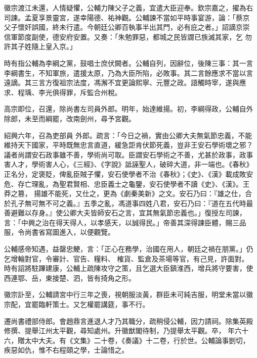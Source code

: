 \begin{pinyinscope}
 徽宗渡江未還，人情疑懼，公輔力陳父子之義，宜遣大臣迎奉。欽宗嘉之，擢為右司諫。孟夏享景靈宮，遂幸陽德、祐神觀。公輔諫不當如平時事宴游，論：「蔡京父子懷奸誤國，終未行遣。今朝廷公卿百執事半出其門，必有庇之者。」詔謫京崇信軍節度副使，德安府安置。又奏：「朱勉罪惡，都城之民皆謂已族滅其家，乞
 勿許其子姓隨上皇入京。」



 時有指公輔為李綱之黨，鼓唱士庶伏闕者。公輔自列，因辭位，後陳三事：其一言李綱書生，不知軍旅，遣援太原，乃為大臣所陷，必敗事。其二言餘應求不當以言遠謫。其三言方復祖宗法度，馮澥不宜更論熙寧、元豐之政。語觸時宰，遂與應求、程瑀、李光俱得罪，斥監合州稅。



 高宗即位，召還，除尚書左司員外郎。明年，始達維揚。初，李綱得政，公輔自外除郎，未至而綱罷，改南劍州，尋予宮觀。



 紹興六年，召為吏部員
 外郎。疏言：「今日之禍，實由公卿大夫無氣節忠義，不能維持天下國家，平時既無忠言直道，緩急詎肯伏節死義，豈非王安石學術壞之邪？議者尚謂安石政事雖不善，學術尚可取。臣謂安石學術之不善，尤甚於政事，政事害人才，學術害人心，《三經》、《字說》詆誣聖人，破碎大道，非一端也。《春秋》正名分，定褒貶，俾亂臣賊子懼，安石使學者不治《春秋》；《史》、《漢》載成敗安危、存亡理亂，為聖君賢相、忠臣義士之龜鑒，安石使學者不讀《史》、《漢》。王莽之篡，
 揚雄不能死，又仕之，更為《劇秦美新》之文。安石乃曰：『雄之仕，合於孔子無可無不可之義。』五季之亂，馮道事四姓八君，安石乃曰：『道在五代時最善避難以存身。』使公卿大夫皆師安石之言，宜其無氣節忠義也。」復授左司諫，言：「中興之治在得天得人，以孝感天，以誠得民。」帝善其深得諫臣體，賜三品服，令尚書省寫圖進入，以便觀覽。



 公輔感帝知遇，益罄忠鯁，言：「正心在務學，治國在用人，朝廷之禍在朋黨。」仍乞增輪對官，令審計、官告、糧料、
 榷貨、監倉及茶場等官，有己見，許面對。時有詔將駐蹕建康，公輔上疏陳攻守之策，且乞選大臣鎮淮西，增兵將守要害，使西連鄂、岳，東接楚、泗，皆有掎角之形。



 徽宗訃至，公輔請宮中行三年之喪，視朝服淡黃，群臣未可純吉服，明堂未當以徽宗配，宜罷臨軒策士。又乞權罷講筵，事不行。



 遷尚書禮部侍郎。會趙鼎言進退人才乃其職分，疏稍侵公輔，因力請祠。除集英殿修撰、提舉江州太平觀，尋知處州。升徽猷閣待制，乃提舉太平觀。卒，
 年六十六，贈太中大夫。有《文集》二十卷，《奏議》十二卷，行於世。公輔論事剴切，疾惡如仇，惟不右程頤之學，士論惜之。




\end{pinyinscope}
